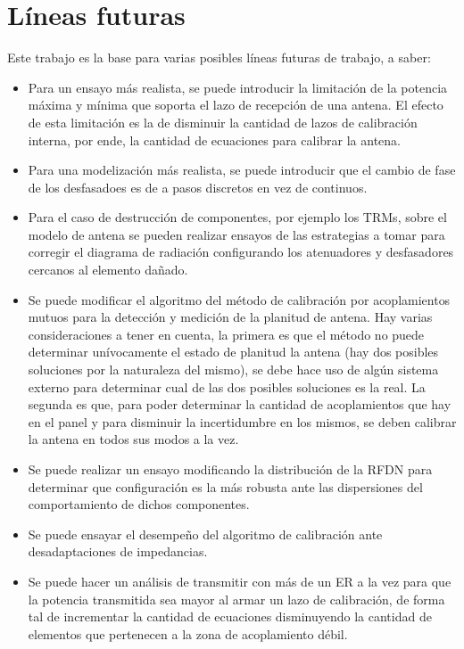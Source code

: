 \section{Líneas futuras}

Este trabajo es la base para varias posibles líneas futuras de trabajo, a saber:
\begin{itemize}
	\item Para un ensayo más realista, se puede introducir la limitación de la potencia máxima y mínima que soporta el lazo 
		de recepción de una antena. El efecto de esta limitación es la de disminuir la cantidad de lazos de calibración interna, 
		por ende, la cantidad de ecuaciones para calibrar la antena.
	\item Para una modelización más realista, se puede introducir que el cambio de fase de los desfasadoes es de a pasos discretos
		en vez de continuos.
	\item Para el caso de destrucción de componentes, por ejemplo los TRMs, sobre el modelo de antena se pueden realizar ensayos 
		de las estrategias a tomar para corregir el diagrama de radiación configurando los atenuadores y desfasadores cercanos al 
		elemento dañado.
	\item Se puede modificar el algoritmo del método de calibración por acoplamientos mutuos para la detección y medición de 
		la planitud de antena. Hay varias consideraciones a tener en cuenta, la primera es que el método no puede determinar 
		unívocamente el estado de planitud la antena (hay dos posibles soluciones por la naturaleza del mismo), se debe hace uso de 
		algún sistema externo para determinar cual de las dos posibles soluciones es la real. La segunda es que, para poder determinar
		la cantidad de acoplamientos que hay en el panel y para disminuir la incertidumbre en los mismos, se deben calibrar la antena 
		en todos sus modos a la vez.
	\item Se puede realizar un ensayo modificando la distribución de la RFDN para determinar que configuración es la más robusta ante 
		las dispersiones del comportamiento de dichos componentes.
	\item Se puede ensayar el desempeño del algoritmo de calibración ante desadaptaciones de impedancias. 
	\item Se puede hacer un análisis de transmitir con más de un ER a la vez para que la potencia transmitida sea mayor al armar
		un lazo de calibración, de forma tal de incrementar la cantidad de ecuaciones disminuyendo la cantidad de elementos que
		pertenecen a la zona de acoplamiento débil. 
\end{itemize}

